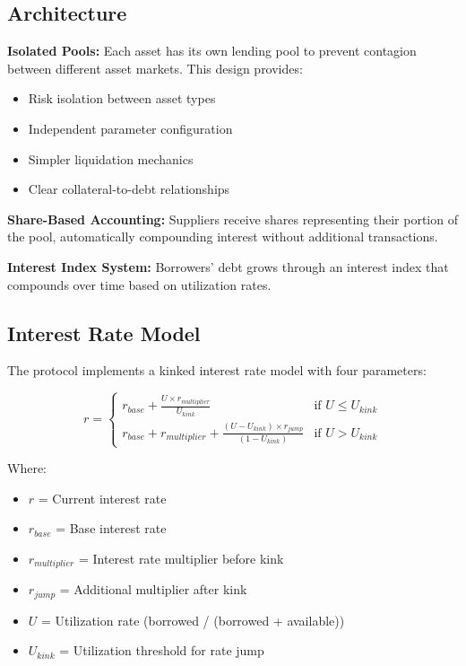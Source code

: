 \documentclass[12pt]{article}
\begin{document}
\subsection{Architecture}

\textbf{Isolated Pools:} Each asset has its own lending pool to prevent contagion between different asset markets. This design provides:
\begin{itemize}
    \item Risk isolation between asset types
    \item Independent parameter configuration
    \item Simpler liquidation mechanics
    \item Clear collateral-to-debt relationships
\end{itemize}

\textbf{Share-Based Accounting:} Suppliers receive shares representing their portion of the pool, automatically compounding interest without additional transactions.

\textbf{Interest Index System:} Borrowers' debt grows through an interest index that compounds over time based on utilization rates.

\subsection{Interest Rate Model}

The protocol implements a kinked interest rate model with four parameters:

$$r = \begin{cases}
r_{base} + \frac{U \times r_{multiplier}}{U_{kink}} & \text{if } U \leq U_{kink} \\
r_{base} + r_{multiplier} + \frac{(U - U_{kink}) \times r_{jump}}{(1 - U_{kink})} & \text{if } U > U_{kink}
\end{cases}$$

Where:
\begin{itemize}
    \item $r$ = Current interest rate
    \item $r_{base}$ = Base interest rate
    \item $r_{multiplier}$ = Interest rate multiplier before kink
    \item $r_{jump}$ = Additional multiplier after kink
    \item $U$ = Utilization rate (borrowed / (borrowed + available))
    \item $U_{kink}$ = Utilization threshold for rate jump
\end{itemize}
\end{document}
